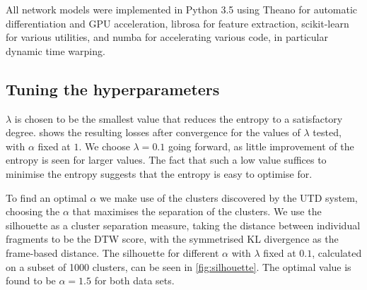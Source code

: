All network models were implemented in Python 3.5 using Theano \parencite{theano} for automatic differentiation and GPU acceleration, librosa \parencite{librosa} for feature extraction, scikit-learn \parencite{scikit-learn} for various utilities, and numba \parencite{numba} for accelerating various code, in particular dynamic time warping.

\subsection{Tuning the hyperparameters}
\label{sec:hypersearch}

$\lambda$ is chosen to be the smallest value that reduces the entropy to a satisfactory degree.
 shows the resulting losses after convergence for the values of $\lambda$ tested, with $\alpha$ fixed at $1$.
We choose $\lambda = 0.1$ going forward, as little improvement of the entropy is seen for larger values.
The fact that such a low value suffices to minimise the entropy suggests that the entropy is easy to optimise for. 

%

To find an optimal $\alpha$ we make use of the clusters discovered by the UTD system, choosing the $\alpha$ that maximises the separation of the clusters.
We use the silhouette \parencite{rousseeuw1987silhouettes} as a cluster separation measure, taking the distance between individual fragments to be the DTW score, with the symmetrised KL divergence as the frame-based distance.
The silhouette for different $\alpha$ with $\lambda$ fixed at $0.1$, calculated on a subset of 1000 clusters, can be seen in \cref{fig:silhouette}.
The optimal value is found to be $\alpha = 1.5$ for both data sets.

